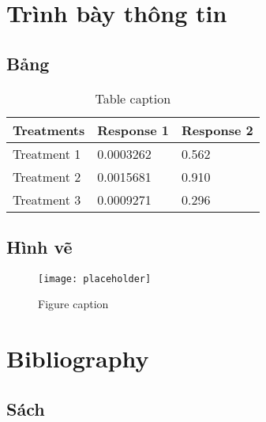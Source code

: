 \documentclass[12pt,fleqn]{book} %
\begin{document}


\chapter{Trình bày thông tin}

\section{Bảng}

\begin{table}[h]
\centering
\begin{tabular}{l l l}
\toprule
\textbf{Treatments} & \textbf{Response 1} & \textbf{Response 2}\\
\midrule
Treatment 1 & 0.0003262 & 0.562 \\
Treatment 2 & 0.0015681 & 0.910 \\
Treatment 3 & 0.0009271 & 0.296 \\
\bottomrule
\end{tabular}
\caption{Table caption}
\end{table}


\section{Hình vẽ}

\begin{figure}[h]
\centering\texttt{[image: placeholder]}
\caption{Figure caption}
\end{figure}


\chapter*{Bibliography}
\section*{Sách}
\printbibliography[heading=bibempty,type=book]
\end{document}
